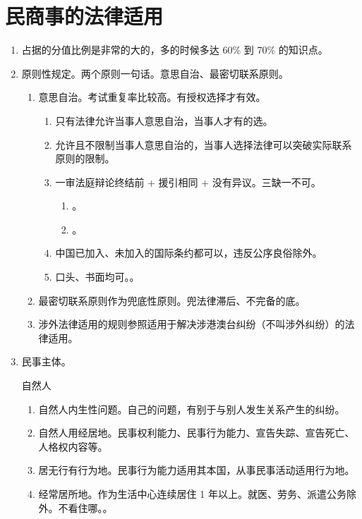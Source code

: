 \section{民商事的法律适用}
\begin{enumerate}
  \item 占据的分值比例是非常的大的，多的时候多达 60\% 到 70\% 的知识点。
  \item 原则性规定。两个原则一句话。意思自治、最密切联系原则。
        \begin{enumerate}
          \item 意思自治。考试重复率比较高。有授权选择才有效。
                \begin{enumerate}
                  \item 只有法律允许当事人意思自治，当事人才有的选。
                  \item 允许且不限制当事人意思自治的，当事人选择法律可以突破实际联系原则的限制。
                  \item 一审法庭辩论终结前 + 援引相同 + 没有异议。三缺一不可。
                        \begin{enumerate}
                          \item {}。
                          \item {}。
                        \end{enumerate}
                  \item 中国已加入、未加入的国际条约都可以，违反公序良俗除外。
                  \item 口头、书面均可。。
                \end{enumerate}
          \item 最密切联系原则作为兜底性原则。兜法律滞后、不完备的底。
          \item 涉外法律适用的规则参照适用于解决涉港澳台纠纷（不叫涉外纠纷）的法律适用。
        \end{enumerate}
  \item 民事主体。
        \begin{kk}{自然人}
          \begin{enumerate}
            \item 自然人内生性问题。自己的问题，有别于与别人发生关系产生的纠纷。
            \item 自然人用经居地。民事权利能力、民事行为能力、宣告失踪、宣告死亡、人格权内容等。
            \item 居无行有行为地。民事行为能力适用其本国，从事民事活动适用行为地。
            \item 经常居所地。作为生活中心连续居住 1 年以上。就医、劳务、派遣公务除外。不看住哪。。
          \end{enumerate}
        \end{kk}


\end{enumerate}
